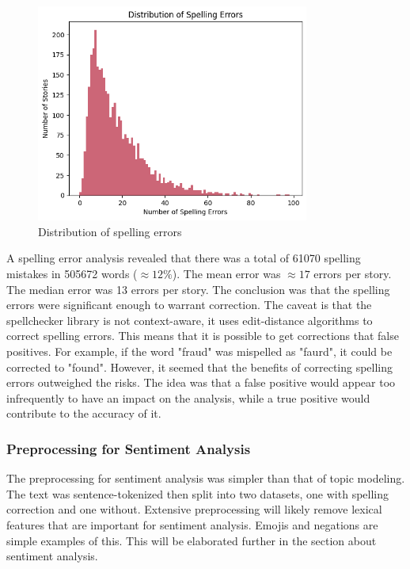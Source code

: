 \begin{figure}[h]
    \centering
    \includegraphics[width=0.8\textwidth]{resources/spelling_mistakes_distribution.png}
    \caption{Distribution of spelling errors}
    \label{fig:spelling_error_distribution}
\end{figure}


A spelling error analysis revealed that there was a total of 61070 spelling mistakes in 505672 words ($\approx 12\%$). The mean error was $\approx17$ errors per story. The median error was 13 errors per story. The conclusion was that the spelling errors were significant enough to warrant correction. The caveat is that the spellchecker library is not context-aware, it uses edit-distance algorithms to correct spelling errors. This means that it is possible to get corrections that false positives. For example, if the word "fraud" was mispelled as "faurd", it could be corrected to "found". However, it seemed that the benefits of correcting spelling errors outweighed the risks. The idea was that a false positive would appear too infrequently to have an impact on the analysis, while a true positive would contribute to the accuracy of it.

\subsubsection*{Preprocessing for Sentiment Analysis}

The preprocessing for sentiment analysis was simpler than that of topic modeling. The text was sentence-tokenized then split into two datasets, one with spelling correction and one without. Extensive preprocessing will likely remove lexical features that are important for sentiment analysis. Emojis and negations are simple examples of this. This will be elaborated further in the section about sentiment analysis.

